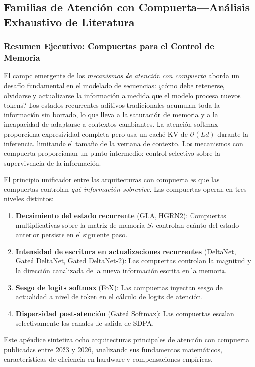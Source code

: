 \subsection{Familias de Atención con Compuerta---Análisis Exhaustivo de Literatura}
\label{sec:annex-gated}

\subsubsection{Resumen Ejecutivo: Compuertas para el Control de Memoria}

El campo emergente de los \emph{mecanismos de atención con compuerta} aborda un desafío fundamental en el modelado de secuencias: ¿cómo debe retenerse, olvidarse y actualizarse la información a medida que el modelo procesa nuevos tokens? Los estados recurrentes aditivos tradicionales acumulan toda la información sin borrado, lo que lleva a la saturación de memoria y a la incapacidad de adaptarse a contextos cambiantes. La atención softmax proporciona expresividad completa pero usa un caché KV de $\mathcal{O}(Ld)$ durante la inferencia, limitando el tamaño de la ventana de contexto. Los mecanismos con compuerta proporcionan un punto intermedio: control selectivo sobre la supervivencia de la información.

El principio unificador entre las arquitecturas con compuerta es que las compuertas controlan \textit{qué información sobrevive}. Las compuertas operan en tres niveles distintos:
\begin{enumerate}[leftmargin=*]
    \item \textbf{Decaimiento del estado recurrente} (GLA, HGRN2): Compuertas multiplicativas sobre la matriz de memoria $S_t$ controlan cuánto del estado anterior persiste en el siguiente paso.
    \item \textbf{Intensidad de escritura en actualizaciones recurrentes} (DeltaNet, Gated DeltaNet, Gated DeltaNet-2): Las compuertas controlan la magnitud y la dirección canalizada de la nueva información escrita en la memoria.
    \item \textbf{Sesgo de logits softmax} (FoX): Las compuertas inyectan sesgo de actualidad a nivel de token en el cálculo de logits de atención.
    \item \textbf{Dispersidad post-atención} (Gated Softmax): Las compuertas escalan selectivamente los canales de salida de SDPA.
\end{enumerate}

Este apéndice sintetiza ocho arquitecturas principales de atención con compuerta publicadas entre 2023 y 2026, analizando sus fundamentos matemáticos, características de eficiencia en hardware y compensaciones empíricas.

